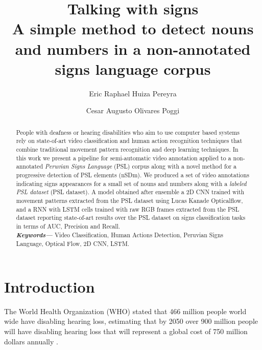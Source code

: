 \documentclass[twocolumn,conference]{article}
\providecommand{\keywords}[1]
{
  \small	
  \textbf{\textit{Keywords---}} #1
}
\begin{document}
\author[1]{Eric Raphael Huiza Pereyra}

\author[2]{Cesar Augusto Olivares Poggi}

\title{%
	\vspace{-2.0cm}
	\textbf{Talking with signs} \\	
	\Large \textbf{A simple method to detect nouns and numbers in a non-annotated signs language corpus}
}

\maketitle
    
\begin{abstract}
People with deafness or hearing disabilities who aim to use computer based systems rely on state-of-art video classification and human action recognition techniques that combine traditional movement pattern recognition and deep learning techniques. In this work we present a pipeline for semi-automatic video annotation applied to a non-annotated \textit{Peruvian Signs Language} (PSL) corpus along with a novel method for a progressive detection of PSL elements (nSDm). We produced a set of video annotations indicating signs appearances for a small set of nouns and numbers along with a \textit{labeled PSL dataset} (PSL dataset). A model obtained after ensemble a 2D CNN trained with movement patterns extracted from the PSL dataset using Lucas Kanade Opticalflow, and a RNN with LSTM cells trained with raw RGB frames extracted from the PSL dataset reporting state-of-art results over the PSL dataset on signs classification tasks in terms of AUC, Precision and Recall. \\
\keywords{Video Classification, Human Actions Detection, Peruvian Signs Language, Optical Flow, 2D CNN, LSTM.}
\end{abstract}

\section{Introduction}\label{intro}
The World Health Organization (WHO) stated that 466 million people world wide have disabling hearing loss, estimating that by 2050 over 900 million people will have disabling hearing loss that will represent a global cost of 750 million dollars annually \cite{deafness_and_hearing_loss_2019}. 
\end{document}
